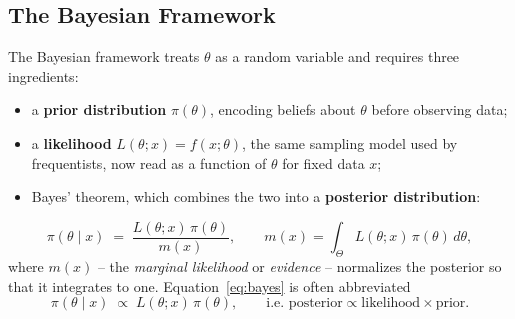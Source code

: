 \documentclass[11pt,a4paper]{article}
\begin{document}
\subsection{The Bayesian Framework}
The Bayesian framework treats $\theta$ as a random variable and requires three ingredients:
\begin{itemize}[leftmargin=2em]
  \item a \textbf{prior distribution} $\pi(\theta)$, encoding beliefs about $\theta$ before observing data;
  \item a \textbf{likelihood} $L(\theta ; x) = f(x ; \theta)$, the same sampling model used by frequentists, now read as a function of $\theta$ for fixed data $x$;
  \item Bayes' theorem, which combines the two into a \textbf{posterior distribution}:
\end{itemize}
\begin{equation}
\pi(\theta \mid x) \;=\; \frac{L(\theta; x)\, \pi(\theta)}{m(x)}, \qquad m(x) = \int_{\Theta} L(\theta; x)\, \pi(\theta)\, d\theta,
\label{eq:bayes}
\end{equation}
where $m(x)$ -- the \emph{marginal likelihood} or \emph{evidence} -- normalizes the posterior so that it integrates to one. Equation~\eqref{eq:bayes} is often abbreviated
\begin{equation}
\pi(\theta \mid x) \;\propto\; L(\theta;x)\,\pi(\theta), \qquad \text{i.e.\ posterior} \propto \text{likelihood} \times \text{prior}.
\end{equation}

\begin{center}
\end{center}
\end{document}
